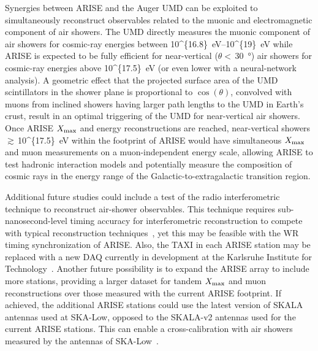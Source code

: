 Synergies between ARISE and the Auger UMD can be exploited to simultaneously reconstruct observables related to the muonic and electromagnetic component of air showers.
The UMD directly measures the muonic component of air showers for cosmic-ray energies between \qtyrange[parse-numbers=false]{10^{16.8}}{10^{19}}{\electronvolt} while ARISE is expected to be fully efficient for near-vertical ($\theta<$\,\qty{30}{\degree}) air showers for cosmic-ray energies above \qty[parse-numbers=false]{10^{17.5}}{\electronvolt} (or even lower with a neural-network analysis).
A geometric effect that the projected surface area of the UMD scintillators in the shower plane is proportional to $\cos(\theta)$, convolved with muons from inclined showers having larger path lengths to the UMD in Earth's crust, result in an optimal triggering of the UMD for near-vertical air showers.
Once ARISE $X_{\rm max}$ and energy reconstructions are reached, near-vertical showers $\gtrsim$\,\qty[parse-numbers=false]{10^{17.5}}{\electronvolt} within the footprint of ARISE would have simultaneous $X_{\rm max}$ and muon measurements on a muon-independent energy scale, allowing ARISE to test hadronic interaction models and potentially measure the composition of cosmic rays in the energy range of the Galactic-to-extragalactic transition region.

Additional future studies could include a test of the radio interferometric technique to reconstruct air-shower observables.
This technique requires sub-nanosecond-level timing accuracy for interferometric reconstruction to compete with typical reconstruction techniques~\cite{schoorlemmer_interferometry_epjc}, yet this may be feasible with the WR timing synchronization of ARISE.
Also, the TAXI in each ARISE station may be replaced with a new DAQ currently in development at the Karlsruhe Institute for Technology~\cite{arena2026_schmitt}.
Another future possibility is to expand the ARISE array to include more stations, providing a larger dataset for tandem $X_{\rm max}$ and muon reconstructions over those measured with the current ARISE footprint.
If achieved, the additional ARISE stations could use the latest version of SKALA antennas used at SKA-Low, opposed to the SKALA-v2 antennas used for the current ARISE stations.
This can enable a cross-calibration with air showers measured by the antennas of SKA-Low~\cite{ska_sciencebook2026_cr_intro}.

